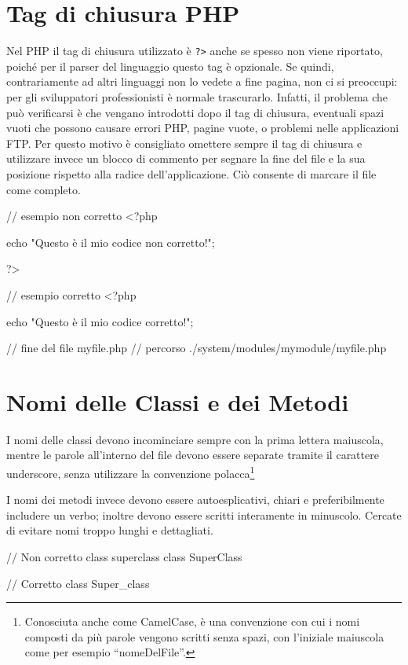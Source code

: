 \section*{Tag di chiusura PHP}
Nel \ac{PHP} il tag di chiusura utilizzato è \verb|?>| anche se spesso non viene riportato, poiché per il parser del linguaggio questo tag è opzionale. Se quindi, contrariamente ad altri linguaggi non lo vedete a fine pagina, non ci si preoccupi: per gli sviluppatori professionisti è normale trascurarlo. Infatti, il problema che può verificarsi è che vengano introdotti dopo il tag di chiusura, eventuali spazi vuoti che possono causare errori \ac{PHP}, pagine vuote, o problemi nelle applicazioni \ac{FTP}. Per questo motivo è consigliato omettere sempre il tag di chiusura e utilizzare invece un blocco di commento per segnare la fine del file e la sua posizione rispetto alla radice dell'applicazione. Ciò consente di marcare il file come completo.

\begin{code}
// esempio non corretto
<?php

echo "Questo è il mio codice non corretto!";

?>

// esempio corretto
<?php

echo "Questo è il mio codice corretto!";

// fine del file myfile.php
// percorso ./system/modules/mymodule/myfile.php
\end{code}

\section*{Nomi delle Classi e dei Metodi}
I nomi delle classi devono incominciare sempre con la prima lettera maiuscola, mentre le parole all'interno del file devono essere separate tramite il carattere underscore, senza utilizzare la convenzione polacca\footnote{Conosciuta anche come CamelCase, è una convenzione con cui i nomi composti da più parole vengono scritti senza spazi, con l'iniziale maiuscola come per esempio ``nomeDelFile''.}

I nomi dei metodi invece devono essere autoesplicativi, chiari e preferibilmente includere un verbo; inoltre devono essere scritti interamente in minuscolo. Cercate di evitare nomi troppo lunghi e dettagliati.

\begin{code}
// Non corretto
class superclass
class SuperClass

// Corretto
class Super_class
\end{code}


